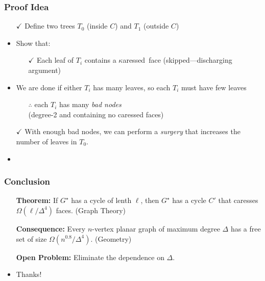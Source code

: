 \documentclass[xcolor=dvipsnames]{beamer}
\newcommand{\caressed}{$\kappa$aressed}
\newcommand{\dual}[1]{#1^\star}
\begin{document}
\begin{frame}
  \frametitle{Proof Idea}

  \begin{itemize}
    \item[$\checkmark$] Define two trees $T_0$ (inside $C$) and $T_1$ (outside $C$)
    \item Show that:
    \begin{itemize}
      \item[$\checkmark$] Each leaf of $T_i$ contains a \caressed\ face
       (skipped---discharging argument)
    \end{itemize}
    \item We are done if either $T_i$ has many leaves, so each $T_i$ must have few leaves
    \begin{itemize}
      \item[$\therefore$] each $T_i$ has many \emph{bad nodes} \\ (degree-2 and containing no caressed faces)
    \end{itemize}
    \item[$\checkmark$] With enough bad nodes, we can perform a \emph{surgery} that increases the number of leaves in $T_0$.
    \item<3->[QED]
  \end{itemize}
  
\end{frame}

\begin{frame}
  \frametitle{Conclusion}
  
  \begin{itemize}
    \item[]\textbf{Theorem:} If $\dual{G}$ has a cycle of lenth $\ell$, then $\dual{G}$ has a cycle $C'$ that caresses $\Omega(\ell/\Delta^4)$ faces. (Graph Theory) \\[1em]

    \item[]\textbf{Consequence:} Every $n$-vertex planar graph of maximum degree $\Delta$ has a free set of size $\Omega(n^{0.8}/\Delta^4)$. 
    (Geometry) \\[1em]

    \item[]\textbf{Open Problem:} Eliminate the dependence on $\Delta$.\\[2em]
    
    \item<2->[] \centerline{\Huge
    \color{violet}T\color{purple}h\color{blue}a\color{green}n\color{yellow}k\color{orange}s\color{red}!}
  \end{itemize}
\end{frame}






\end{document}
